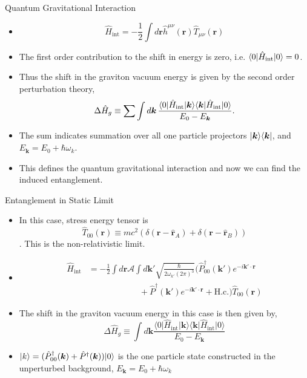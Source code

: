\documentclass[12pt,aspectratio=1610]{beamer}
\newcommand{\Hint}{\hat{H}_{\text{int}}}
\DeclarePairedDelimiter\bra{\langle}{\rvert}
\DeclarePairedDelimiter\ket{\lvert}{\rangle}
\begin{document}
\begin{frame}{Quantum Gravitational Interaction}
    \begin{itemize}
        \item $$\hat{H}_{\text{int}}=-\frac{1}{2}\int d\bm{r}\hat{h}^{\mu\nu}(\bm{r})\hat{T}_{\mu\nu}(\bm{r})$$
        \item The first order contribution to the shift in energy is zero, i.e. $\bra{0}\Hint\ket{0} = 0$.
        \item Thus the shift in the graviton vacuum energy is given by the second order perturbation theory,
        \begin{equation*}
    \Delta \hat{H}_{g} \equiv \sum \int d\bm{k} \,\frac{\bra{0}\Hint\ket{\bm{k}}\bra{\bm{k}}\Hint\ket{0}}{E_0 - E_{\bm{k}}}.
\end{equation*}
\item The sum indicates summation over all one particle projectors $\ket{\bm{k}}\bra{\bm{k}}$, and $E_{\bm{k}} = E_0 + \hbar\omega_k$.
\item This defines the quantum gravitational interaction and now we can find the induced entanglement.
    \end{itemize}
\end{frame}

\begin{frame}{Entanglement in Static Limit}
\begin{itemize}
    \item In this case, stress energy tensor is $$\hat{T}_{00}(\bm{r})\equiv mc^{2}(\delta(\bm{r}-\hat{\bm{r}}_{A})+\delta(\bm{r}-\hat{\bm{r}}_{B}))$$ \citep{Bose_2022}. This is the non-relativistic limit.
    \item \begin{equation*}
    \begin{aligned}
        \Hint &= -\frac{1}{2} \int d{\bm{r}} \mathcal{A}\int d\bm{k'} \sqrt{\frac{\hbar}{2\omega_{k'} (2\pi)^3}}\Big(\hat{P}_{00}^{\dagger}(\bm{k'})e^{-i\bm{k'}\cdot\bm{r}}\\
        &\qquad\qquad\qquad+ \hat{P}^{\dagger}(\bm{k'})e^{-i\bm{k'}\cdot\bm{r}} + \text{H.c.} \Big)\hat{T}_{00}(\bm{r})
    \end{aligned}
    \end{equation*}
    \item The shift in the graviton vacuum energy in this case is then given by, $$\Delta{\hat{H}_{g}}\equiv\int d\bm{k}\frac{\langle0\vert\hat{H}_{\text{int}}\vert\bm{k}\rangle\langle\bm{k}\vert\hat{H}_{\text{int}}\vert0\rangle}{E_{0}-E_{\bm{k}}}$$
    \item  $\ket{k} = (\hat{P}_{00}^{\dagger}(\bm{k}) + \hat{P}^{\dagger}(\bm{k})) \ket{0}$ is the one particle state constructed in the unperturbed background, $E_{\bm{k}} = E_0 + \hbar\omega_k$
\end{itemize}
\end{frame}
\end{document}
